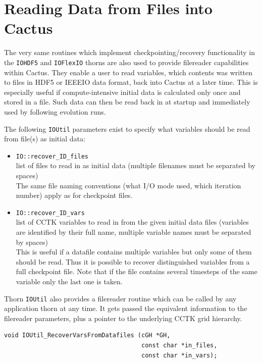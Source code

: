 \documentclass{article}
\begin{document}
\section{Reading Data from Files into Cactus}

The very same routines which implement checkpointing/recovery functionality
in the {\tt IOHDF5} and {\tt IOFlexIO} thorns are also used to provide
filereader capabilities within Cactus. They enable a user to read variables,
which contents was written to files in HDF5 or IEEEIO data format, back into
Cactus at a later time. This is especially useful if compute-intensive
initial data is calculated only once and stored in a file. Such data
can then be read back in at startup and immediately used by following evolution
runs.

The following {\tt IOUtil} parameters exist to specify what variables should be
read from file(s) as initial data:

\begin{itemize}
  \item {\tt IO::recover\_ID\_files}\\
  list of files to read in as initial data (multiple filenames must be separated by spaces)\\
  The same file naming conventions (what I/O mode used, which iteration number)
  apply as for checkpoint files.
  \item {\tt IO::recover\_ID\_vars}\\
  list of CCTK variables to read in from the given initial data files (variables
  are identified by their full name, multiple variable names must be separated by spaces)\\
  This is useful if a datafile contains multiple variables but only some of
  them should be read. Thus it is possible to recover distinguished
  variables from a full checkpoint file. Note that if the file contains several
  timesteps of the same variable only the last one is taken.
\end{itemize}

Thorn {\tt IOUtil} also provides a filereader routine which can be called
by any application thorn at any time. It gets passed the equivalent information
to the filereader parameters, plus a pointer to the underlying CCTK grid hierarchy.

\begin{verbatim}
void IOUtil_RecoverVarsFromDatafiles (cGH *GH,
                                      const char *in_files,
                                      const char *in_vars);
\end{verbatim}
\end{document}
